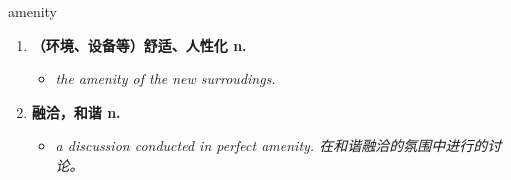 
\begin{frame}
{\huge amenity}
\begin{center}
\begin{enumerate}\Large
  \item \textbf{（环境、设备等）舒适、人性化 n.}
  \begin{itemize}
    \item \em{\Large{the amenity of the new surroudings.}}
  \end{itemize}
  \item \textbf{融洽，和谐 n.}
  \begin{itemize}
    \item \em{\Large{a discussion conducted in perfect amenity. 在和谐融洽的氛围中进行的讨论。}}
  \end{itemize}
\end{enumerate}
\end{center}
\end{frame}
